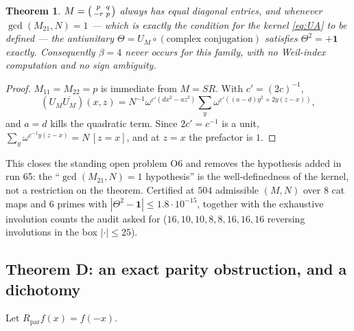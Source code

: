 \documentclass[11pt,reqno]{amsart}
\newtheorem{theorem}{Theorem}[section]
\theoremstyle{definition}
\begin{document}
\begin{theorem}\label{thm:C}
$M=\begin{psmallmatrix}p&q\\-r&p\end{psmallmatrix}$ always has equal diagonal
entries, and whenever $\gcd(M_{21},N)=1$ --- which is exactly the condition for
the kernel \eqref{eq:UA} to be defined --- the antiunitary
$\Theta=U_M\circ(\text{complex conjugation})$ satisfies $\Theta^2=+\mathbf 1$
exactly. Consequently $\beta=4$ never occurs for this family, with no Weil-index
computation and no sign ambiguity.
\end{theorem}

\begin{proof}
$M_{11}=M_{22}=p$ is immediate from $M=SR$. With $c'=(2c)^{-1}$,
\[
  (U_M\overline{U_M})(x,z)=N^{-1}\omega^{c'(dx^2-az^2)}
    \sum_{y}\omega^{c'((a-d)y^2+2y(z-x))},
\]
and $a=d$ kills the quadratic term. Since $2c'=c^{-1}$ is a unit,
$\sum_y\omega^{c^{-1}y(z-x)}=N\,[z=x]$, and at $z=x$ the prefactor is $1$.
\end{proof}

This closes the standing open problem O6 and removes the hypothesis added in run
65: the ``$\gcd(M_{21},N)=1$ hypothesis'' is the well-definedness of the kernel,
not a restriction on the theorem. Certified at $504$ admissible $(M,N)$ over $8$
cat maps and $6$ primes with $|\Theta^2-\mathbf1|\le1.8\cdot10^{-15}$, together
with the exhaustive involution counts the audit asked for ($16,10,10,8,8,16,16,16$
reversing involutions in the box $|\cdot|\le25$).

\subsection{Theorem D: an exact parity obstruction, and a dichotomy}

Let $R_{\mathrm{par}}f(x)=f(-x)$.
\end{document}
